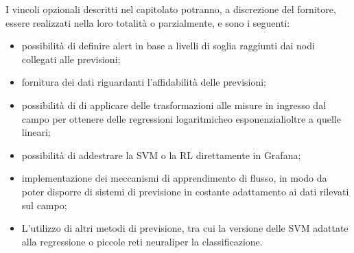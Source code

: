 	 	I vincoli opzionali descritti nel capitolato potranno, a discrezione del fornitore, essere realizzati nella loro totalità o parzialmente, e sono i seguenti:
		\begin{itemize}
			\item possibilità di definire alert in base a livelli di soglia raggiunti dai nodi collegati alle previsioni;
			\item fornitura dei dati riguardanti l’affidabilità delle previsioni;
			\item possibilità di di applicare delle trasformazioni alle misure in ingresso dal campo per ottenere delle regressioni logaritmiche\glo o esponenziali\glo oltre a quelle lineari;
			\item possibilità di addestrare la SVM o la RL direttamente in Grafana;
			\item implementazione dei meccanismi di apprendimento di flusso, in modo da poter disporre di sistemi di previsione in costante adattamento ai dati rilevati sul campo;
			\item L’utilizzo di altri metodi di previsione, tra cui la versione delle SVM adattate alla regressione o piccole reti neurali\glo per la classificazione\glo.

		\end{itemize}